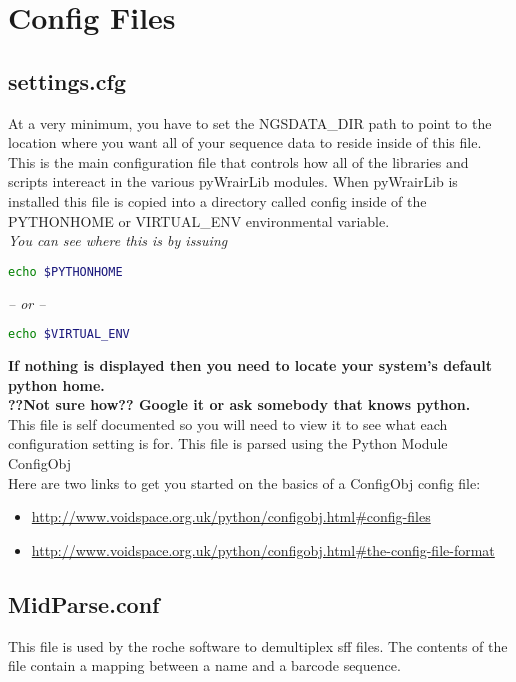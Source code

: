 \documentclass{article}
\begin{document}
\section{Config Files}

\subsection{settings.cfg}
\label{sec:settings.cfg}
At a very minimum, you have to set the NGSDATA\_DIR path to point to the location where you want all of your sequence data to reside inside of this file.\\
This is the main configuration file that controls how all of the libraries and scripts intereact in the various pyWrairLib modules. When pyWrairLib is installed this file is copied into a directory called config inside of the PYTHONHOME or VIRTUAL\_ENV environmental variable.\\
\textit{You can see where this is by issuing}
\begin{lstlisting}[language=bash]
echo $PYTHONHOME
\end{lstlisting}
\textit{-- or --}
\begin{lstlisting}[language=bash]
echo $VIRTUAL_ENV
\end{lstlisting}
\textbf{If nothing is displayed then you need to locate your system's default python home.}\\
\textbf{??Not sure how?? Google it or ask somebody that knows python.}\\
This file is self documented so you will need to view it to see what each configuration setting is for. This file is parsed using the Python Module ConfigObj\\
Here are two links to get you started on the basics of a ConfigObj config file:
\begin{itemize}
 \item \url{http://www.voidspace.org.uk/python/configobj.html#config-files}
 \item \url{http://www.voidspace.org.uk/python/configobj.html#the-config-file-format}
\end{itemize}

\subsection{MidParse.conf}
This file is used by the roche software to demultiplex sff files. The contents of the file contain a mapping between a name and a barcode sequence.
\end{document}
